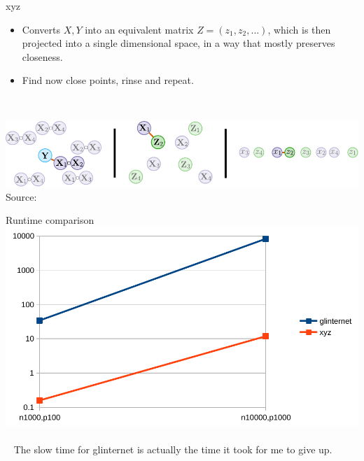 \begin{frame}{xyz}
	\begin{itemize}
		\item Converts $X, Y$ into an equivalent matrix $Z = (z_1,z_2,...)$, which is then projected into a single dimensional space, in a way that mostly preserves closeness.
		\item Find now close points, rinse and repeat.
	\end{itemize}
	~\\
	\begin{minipage}{\linewidth}
		\centering
		\includegraphics[width=0.7\linewidth]{xyz_explanation}
		{Source: \cite{thanei2018xyz}}
	\end{minipage}
\end{frame}

\begin{frame}{Runtime comparison}
\centering
	\includegraphics[width=0.75\linewidth]{time_comparison}
	\\~\\~
	The slow time for glinternet is actually the time it took for me to give up.
\end{frame}


